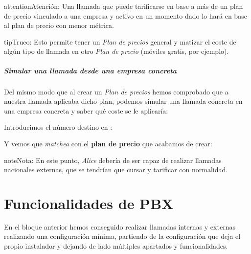 \documentclass[letterpaper,10pt,spanish]{sphinxmanual}
\begin{document}
\begin{notice}{attention}{Atención:}
Una llamada que puede tarificarse en base a más de un plan de    precio vinculado a una empresa y activo en un momento dado lo hará en base al    plan de precio con menor métrica.
\end{notice}

\begin{notice}{tip}{Truco:}
Esto permite tener un \emph{Plan de precios} general y matizar el coste de algún tipo de llamada en otro \emph{Plan de precio} (móviles gratis, por ejemplo).
\end{notice}
\paragraph{Simular una llamada desde una empresa concreta}

Del mismo modo que al crear un \emph{Plan de precios} hemos comprobado que a nuestra llamada aplicaba dicho plan, podemos simular una llamada concreta en una empresa concreta y saber qué coste se le aplicaría:

\noindent{}

Introducimos el número destino en {\hyperref[external_incoming_calls/numeric_transformations:e164]{}}:


Y vemos que \emph{matchea} con el \textbf{plan de precio} que acabamos de crear:

\noindent{}

\begin{notice}{note}{Nota:}
En este punto, \emph{Alice} debería de ser capaz de realizar llamadas nacionales externas, que se tendrían que cursar y tarificar con normalidad.
\end{notice}


\chapter{Funcionalidades de PBX}
\label{pbx_features/index:pbx-features}\label{pbx_features/index::doc}
En el bloque anterior hemos conseguido realizar llamadas internas y externas realizando una configuración mínima, partiendo de la configuración que deja el propio instalador y dejando de lado múltiples apartados y funcionalidades.
\end{document}
